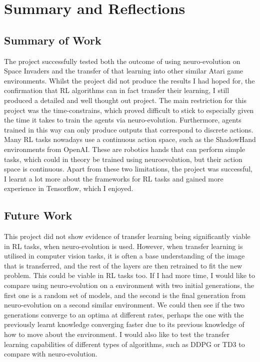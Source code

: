 \chapter{Summary and Reflections}

\label{ch:summary}

\section{Summary of Work}

The project successfully tested both the outcome of using neuro-evolution on Space Invaders and the transfer of that learning into other similar Atari game environments. Whilst the project did not produce the results I had hoped for, the confirmation that RL algorithms can in fact transfer their learning, I still produced a detailed and well thought out project. The main restriction for this project was the time-constrains, which proved difficult to stick to especially given the time it takes to train the agents via neuro-evolution. Furthermore, agents trained in this way can only produce outputs that correspond to discrete actions. Many RL tasks nowadays use a continuous action space, such as the ShadowHand environments from OpenAI. These are robotics hands that can perform simple tasks, which could in theory be trained using neuroevolution, but their action space is continuous. Apart from these two limitations, the project was successful, I learnt a lot more about the frameworks for RL tasks and gained more experience in Tensorflow, which I enjoyed.

\section{Future Work}


This project did not show evidence of transfer learning being significantly viable in RL tasks, when neuro-evolution is used. However, when transfer learning is utilised in computer vision tasks, it is often a base understanding of the image that is transferred, and the rest of the layers are then retrained to fit the new problem. This could be viable in RL tasks too. If I had more time, I would like to compare using neuro-evolution on a environment with two initial generations, the first one is a random set of models, and the second is the final generation from neuro-evolution on a second similar environment. We could then see if the two generations converge to an optima at different rates, perhaps the one with the previously learnt knowledge converging faster due to its previous knowledge of how to move about the environment. I would also like to test the transfer learning capabilities of different types of algorithms, such as DDPG or TD3 to compare with neuro-evolution.
